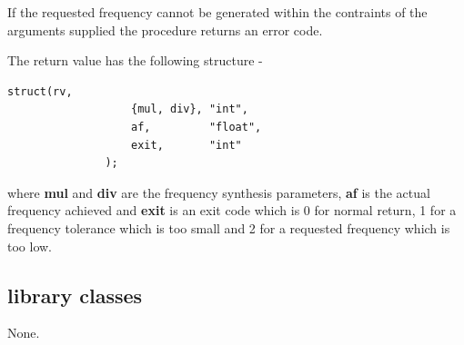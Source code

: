             
            If the requested frequency cannot be generated within the
            contraints of the arguments supplied the procedure returns
            an error code.
            
            The return value has the following structure -
            
            \begin{lstlisting}[gobble=12, language=threepl]
               struct(rv,
                   {mul, div}, "int",
                   af,         "float",
                   exit,       "int"
               );
            \end{lstlisting}
            where {\bf mul} and {\bf div} are the frequency synthesis parameters,
            {\bf af} is the actual frequency achieved and {\bf exit} is an exit code
            which is 0 for normal return, 1 for a frequency tolerance which is too
            small and 2 for a requested frequency which is too low.
            



    \subsection{library classes}
    
        None.

